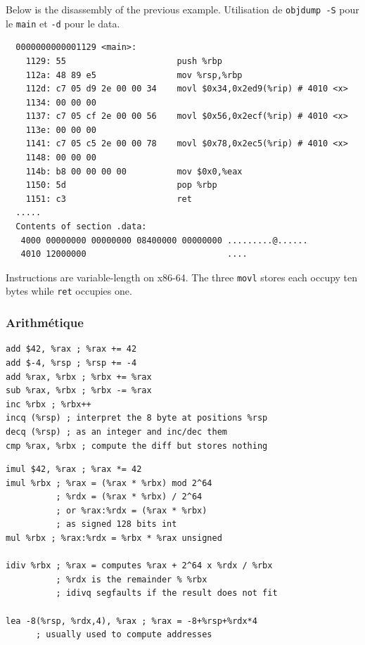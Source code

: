 \begin{example}[Disassembly]
  Below is the disassembly of the previous example. Utilisation de
  \verb|objdump -S| pour le \verb|main| et \verb|-d| pour le data.
  \begin{lstlisting}
  0000000000001129 <main>:
    1129: 55                      push %rbp
    112a: 48 89 e5                mov %rsp,%rbp
    112d: c7 05 d9 2e 00 00 34    movl $0x34,0x2ed9(%rip) # 4010 <x>
    1134: 00 00 00
    1137: c7 05 cf 2e 00 00 56    movl $0x56,0x2ecf(%rip) # 4010 <x>
    113e: 00 00 00
    1141: c7 05 c5 2e 00 00 78    movl $0x78,0x2ec5(%rip) # 4010 <x>
    1148: 00 00 00
    114b: b8 00 00 00 00          mov $0x0,%eax
    1150: 5d                      pop %rbp
    1151: c3                      ret
  .....
  Contents of section .data:
   4000 00000000 00000000 08400000 00000000 .........@......
   4010 12000000                            ....
  \end{lstlisting}
\end{example}
\begin{remark}
  Instructions are variable-length on x86-64. The three \verb|movl| stores
  each occupy ten bytes while \verb|ret| occupies one. 
\end{remark}

\subsubsection{Arithmétique}
\begin{lstlisting}[language=gas]
add $42, %rax ; %rax += 42
add $-4, %rsp ; %rsp += -4
add %rax, %rbx ; %rbx += %rax
sub %rax, %rbx ; %rbx -= %rax
inc %rbx ; %rbx++
incq (%rsp) ; interpret the 8 byte at positions %rsp
decq (%rsp) ; as an integer and inc/dec them
cmp %rax, %rbx ; compute the diff but stores nothing
\end{lstlisting}
\begin{lstlisting}[language=gas]
imul $42, %rax ; %rax *= 42
imul %rbx ; %rax = (%rax * %rbx) mod 2^64
          ; %rdx = (%rax * %rbx) / 2^64
          ; or %rax:%rdx = (%rax * %rbx)
          ; as signed 128 bits int
mul %rbx ; %rax:%rdx = %rbx * %rax unsigned

idiv %rbx ; %rax = computes %rax + 2^64 x %rdx / %rbx
          ; %rdx is the remainder % %rbx
          ; idivq segfaults if the result does not fit

lea -8(%rsp, %rdx,4), %rax ; %rax = -8+%rsp+%rdx*4
      ; usually used to compute addresses
\end{lstlisting}

